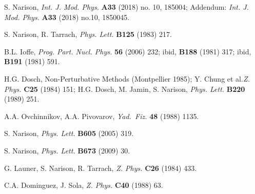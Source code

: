 \begin{thebibliography}{999}
 
  S. Narison,  {\it Int. J. Mod. Phys.} {\bf A33} (2018) no. 10, 185004; %
  Addendum: {\it Int. J. Mod. Phys.} {\bf A33} (2018) no.10, 1850045.%
  
S. Narison, R. Tarrach, {\it Phys. Lett.} {\bf B125} (1983) 217.

  
 
 
 
B.L. Ioffe, {\it Prog. Part. Nucl. Phys.} {\bf 56} (2006) 232; 
ibid, {\bf B188} (1981)  317;
ibid, {\bf B191} (1981) 591.


H.G. Dosch, Non-Perturbative Methods (Montpellier 1985);  
Y. Chung et al.{\it Z. Phys.} {\bf C25} (1984)  151;  
H.G. Dosch, M. Jamin, S. Narison, {\it Phys. Lett.} {\bf B220} (1989)  251.

A.A. Ovchinnikov, A.A. Pivovarov, {\it Yad.\ Fiz.}  {\bf 48} (1988) 1135.




 S. Narison, {\it Phys. Lett.} {\bf B605} (2005) 319.
 
 S. Narison, {\it Phys. Lett.} {\bf B673} (2009) 30.
 

G. Launer, S. Narison, R. Tarrach, {\it  Z. Phys.} {\bf C26}
(1984) 433.

 C.A. Dominguez, J. Sola, {\it  Z. Phys.} {\bf C40}
(1988) 63.


\end{thebibliography}
